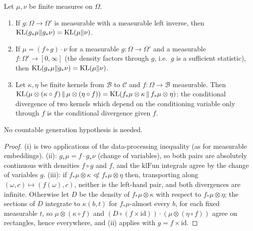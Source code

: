 \begin{lemma}\label{lem:kl_sufficient_statistic}
\leanok
{}
Let $\mu,\nu$ be finite measures on $\Omega$.
\begin{enumerate}
\item[(i)] If $g : \Omega \to \Omega'$ is measurable with a measurable left inverse, then
  $\mathrm{KL}(g_*\mu\|g_*\nu) = \mathrm{KL}(\mu\|\nu)$.
\item[(ii)] If $\mu = (f\circ g)\cdot\nu$ for a measurable $g : \Omega\to\Omega'$ and a measurable
  $f : \Omega' \to [0,\infty]$ (the density factors through $g$, i.e.\ $g$ is a sufficient
  statistic), then $\mathrm{KL}(g_*\mu\|g_*\nu) = \mathrm{KL}(\mu\|\nu)$.
\item[(iii)] Let $\kappa,\eta$ be finite kernels from $\mathcal{B}$ to $\mathcal{C}$ and
  $f : \Omega\to\mathcal{B}$ measurable. Then
  $\mathrm{KL}(\mu\otimes(\kappa\circ f)\,\|\,\mu\otimes(\eta\circ f)) = \mathrm{KL}(f_*\mu\otimes\kappa\,\|\,f_*\mu\otimes\eta)$:
  the conditional divergence of two kernels which depend on the conditioning variable only through
  $f$ is the conditional divergence given $f$.
\end{enumerate}
No countable generation hypothesis is needed.
\end{lemma}

\begin{proof}
\leanok
{}
(i) is two applications of the data-processing inequality (as for measurable embeddings).
(ii): $g_*\mu = f\cdot g_*\nu$ (change of variables), so both pairs are absolutely continuous
with densities $f\circ g$ and $f$, and the $\mathrm{klFun}$ integrals agree by the change of
variables $g$. (iii): if $f_*\mu\otimes\kappa\not\ll f_*\mu\otimes\eta$ then, transporting along
$(\omega,c)\mapsto(f(\omega),c)$, neither is the left-hand pair, and both divergences are
infinite. Otherwise let $D$ be the density of $f_*\mu\otimes\kappa$ with respect to
$f_*\mu\otimes\eta$; the sections of $D$ integrate to $\kappa(b,t)$ for $f_*\mu$-almost every $b$,
for each fixed measurable $t$, so $\mu\otimes(\kappa\circ f)$ and $(D\circ(f\times\mathrm{id}))\cdot(\mu\otimes(\eta\circ f))$
agree on rectangles, hence everywhere, and (ii) applies with $g = f\times\mathrm{id}$.
\end{proof}

